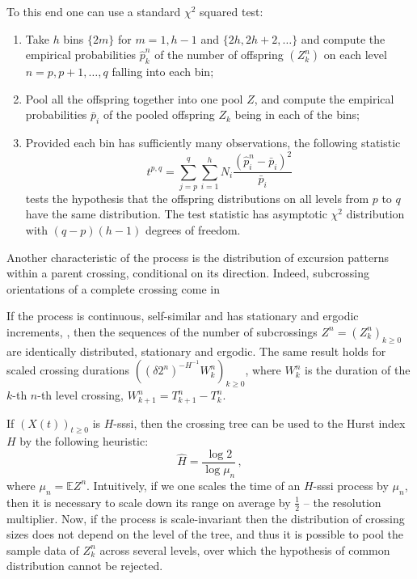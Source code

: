 \documentclass[a4paper]{article}
\newcommand{\ex}{\mathbb{E}}
\begin{document}
To this end one
can use a standard $\chi^2$ squared test:
\begin{enumerate}
    \item Take $h$ bins $\{2m\}$ for $m = 1,h-1$ and $\{2h, 2h+2,\ldots\}$ and compute
    the empirical probabilities $\hat{p}_k^n$ of the number of offspring $(Z_k^n)$ on
    each level $n=p, p+1, \ldots, q$ falling into each bin;
    \item Pool all the offspring together into one pool $Z$, and compute the empirical
    probabilities $\bar{p}_i$ of the pooled offspring $Z_k$ being in each of the bins;
    \item Provided each bin has sufficiently many observations, the following statistic
    \[ t^{p,q} = \sum_{j=p}^q \sum_{i=1}^h N_i \frac{(\hat{p}_i^n-\bar{p}_i)^2}{\bar{p}_i} \]
    tests the hypothesis that the offspring distributions on all levels from $p$ to $q$
    have the same distribution. The test statistic has asymptotic $\chi^2$ distribution
    with $(q-p)(h-1)$ degrees of freedom.
\end{enumerate}

Another characteristic of the process is the distribution of excursion patterns within
a parent crossing, conditional on its direction. Indeed, subcrossing orientations
of a complete crossing come in

If the process is continuous, self-similar and has stationary and ergodic increments,
\cite{jonesshen2005}, then the sequences of the number of subcrossings $Z^n = (Z_k^n)_{k\geq 0}$
are identically distributed, stationary and ergodic. The same result holds for
scaled crossing durations $((\delta 2^n)^{-H^{-1}} W_k^n)_{k\geq0}$, where $W_k^n$
is the duration of the $k$-th $n$-th level crossing, $W_{k+1}^n = T_{k+1}^n - T_k^n$.

If $(X(t))_{t\geq 0}$ is $H$-sssi, then the crossing tree can be used to the Hurst
index $H$ by the following heuristic:
\begin{equation*}
    \hat{H} = \frac{\log 2}{\log \mu_n} \,,
\end{equation*}
where $\mu_n = \ex Z^n$. Intuitively, if we one scales the time of an $H$-sssi
process by $\mu_n$, then it is necessary to scale down its range on average
by $\frac{1}{2}$ -- the resolution multiplier. Now, if the process is scale-invariant
then the distribution of crossing sizes does not depend on the level of the tree,
and thus it is possible to pool the sample data of $Z^n_k$ across several levels,
over which the hypothesis of common distribution cannot be rejected.
\end{document}

